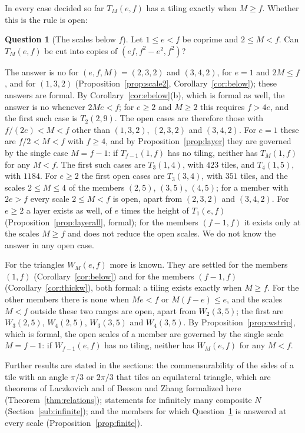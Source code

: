 \documentclass[11pt,reqno]{amsart}
\theoremstyle{plain}
\theoremstyle{definition}
\newtheorem{question}[theorem]{Question}
\begin{document}
In every case decided so far $T_M(e,f)$ has a tiling exactly when $M\ge f$. Whether this is the rule is
open:

\begin{question}[The scales below $f$]\label{q:threshold}
Let $1\le e<f$ be coprime and $2\le M<f$. Can $T_M(e,f)$ be cut into copies of $(ef,f^2-e^2,f^2)$?
\end{question}

The answer is no for $(e,f,M)=(2,3,2)$ and $(3,4,2)$, for $e=1$ and $2M\le f$, and for $(1,3,2)$
(Proposition~\ref{prop:scale2}, Corollary~\ref{cor:below}); these answers are formal. By
Corollary~\ref{cor:ebelow}\textup{(b)}, which is formal as well, the answer is no whenever $2Me<f$;
for $e\ge2$ and $M\ge2$ this requires $f>4e$, and the first such case is $T_2(2,9)$. The open cases are
therefore those with $f/(2e)<M<f$ other than $(1,3,2)$, $(2,3,2)$ and $(3,4,2)$. For $e=1$ these are
$f/2<M<f$ with $f\ge4$, and by Proposition~\ref{prop:layer} they are governed by the single case $M=f-1$: if
$T_{f-1}(1,f)$ has no tiling, neither has $T_M(1,f)$ for any $M<f$. The first such cases are $T_3(1,4)$,
with $423$ tiles, and $T_4(1,5)$, with $1184$. For $e\ge2$ the first open cases are $T_3(3,4)$, with $351$
tiles, and the scales $2\le M\le4$ of the members $(2,5)$, $(3,5)$, $(4,5)$; for a member with $2e>f$ every
scale $2\le M<f$ is open, apart from $(2,3,2)$ and $(3,4,2)$. For $e\ge2$ a layer exists as well, of $e$ times
the height of $T_1(e,f)$ (Proposition~\ref{prop:layerall}, formal); for the members $(f-1,f)$ it exists
only at the scales $M\ge f$ and does not reduce the open scales. We do not know the answer in any open case.

For the triangles $W_M(e,f)$ more is known. They are settled for the members $(1,f)$
(Corollary~\ref{cor:below}) and for the members $(f-1,f)$ (Corollary~\ref{cor:thickw}), both formal: a
tiling exists exactly when $M\ge f$. For the other members there is none when $Me<f$ or
$M(f-e)\le e$, and the scales $M<f$ outside these two ranges are open, apart from $W_2(3,5)$; the first are
$W_3(2,5)$, $W_4(2,5)$, $W_3(3,5)$ and $W_4(3,5)$. By Proposition~\ref{prop:wstrip}, which is formal, the open
scales of a member are governed by the single scale $M=f-1$: if $W_{f-1}(e,f)$ has no tiling,
neither has $W_M(e,f)$ for any $M<f$.

Further results are stated in the sections: the commensurability of the sides of a tile with an angle
$\pi/3$ or $2\pi/3$ that tiles an equilateral triangle, which are theorems of Laczkovich and of Beeson and
Zhang formalized here (Theorem~\ref{thm:relations}); statements for infinitely many composite $N$
(Section~\ref{sub:infinite}); and the members for which Question~\ref{q:threshold} is answered at every
scale (Proposition~\ref{prop:finite}).
\end{document}

